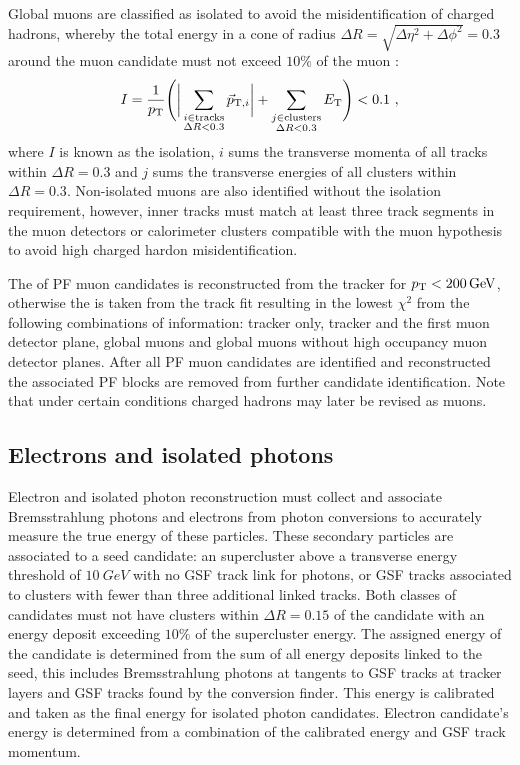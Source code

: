 Global muons are classified as isolated to avoid the misidentification of
charged hadrons, whereby the total energy in a cone of radius ${\Delta
R=\sqrt{\Delta\eta^2+\Delta\phi^2}=0.3}$ around the muon candidate must not
exceed $10\%$ of the muon \pt:
%
\begin{equation}
    I = \frac{1}{\pt}\Biggl(\bigg|\sum_{\substack{i\in \mathrm{tracks}\\\Delta R<0.3}} \vec{p}_{\mathrm{T},i}\bigg| + \sum_{\substack{j\in \mathrm{clusters}\\\Delta R<0.3}}E_{\mathrm{T}}\Biggr) < 0.1\ ,
\end{equation}
%
where $I$ is known as the isolation, $i$ sums the transverse momenta of all
tracks within $\Delta R=0.3$ and $j$ sums the transverse energies of all
clusters within $\Delta R=0.3$. Non-isolated muons are also identified without
the isolation requirement, however, inner tracks must match at least three
track segments in the muon detectors or calorimeter clusters compatible with
the muon hypothesis to avoid high \pt charged hardon misidentification.

The \pt of PF muon candidates is reconstructed from the tracker for
${p_{\text{T}}<\SI{200}{GeV}}$, otherwise the \pt is taken from the track fit resulting
in the lowest $\chi^2$ from the following combinations of information: tracker
only, tracker and the first muon detector plane, global muons and global muons
without high occupancy muon detector planes. After all PF muon candidates are
identified and reconstructed the associated PF blocks are removed from further
candidate identification. Note that under certain conditions charged hadrons
may later be revised as muons.


\subsection{Electrons and isolated photons}

Electron and isolated photon reconstruction must collect and associate
Bremsstrahlung photons and electrons from photon conversions to accurately
measure the true energy of these particles. These secondary particles are
associated to a seed candidate: an \ECAL supercluster above a transverse
energy threshold of ${\SI{10}{GeV}}$ with no GSF track link for photons, or
GSF tracks associated to \ECAL clusters with fewer than three additional
linked tracks. Both classes of candidates must not have \HCAL clusters within
${\Delta R=0.15}$ of the candidate with an energy deposit exceeding $10\%$ of
the supercluster energy. The assigned energy of the candidate is determined
from the sum of all energy deposits linked to the seed, this includes
Bremsstrahlung photons at tangents to GSF tracks at tracker layers and GSF
tracks found by the conversion finder. This energy is calibrated and taken as
the final energy for isolated photon candidates. Electron candidate's energy
is determined from a combination of the calibrated \ECAL energy and GSF track
momentum.


